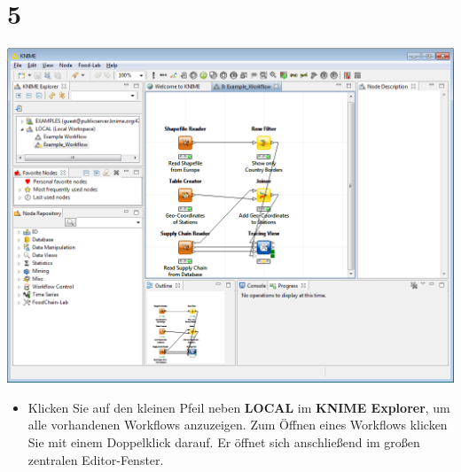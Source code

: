 \documentclass{beamer}
\begin{document}
\section{5}
\begin{frame}
	\begin{center}
  		\includegraphics[height=0.6\textheight]{5.png}
	\end{center}
	\begin{itemize}
		\item Klicken Sie auf den kleinen Pfeil neben \textbf{LOCAL} im \textbf{KNIME Explorer}, um alle vorhandenen Workflows anzuzeigen. Zum Öffnen eines Workflows klicken Sie mit einem Doppelklick darauf. Er öffnet sich anschließend im großen zentralen Editor-Fenster.
	\end{itemize}
\end{frame}
\end{document}
